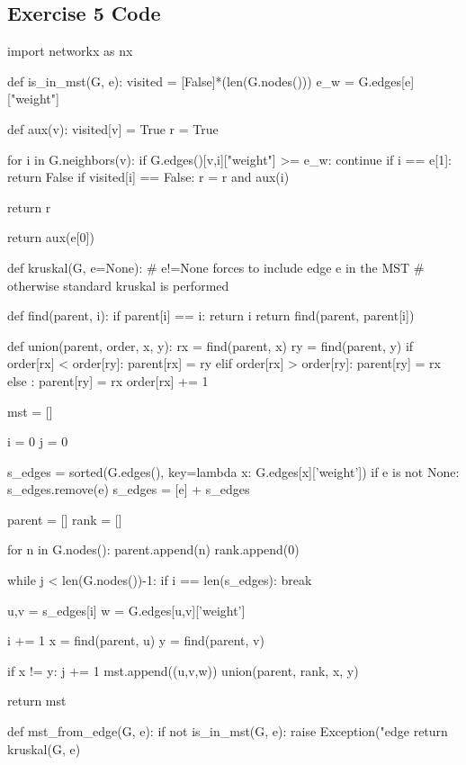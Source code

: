 \documentclass[paper=a4, fontsize=11pt]{scrartcl} %
\numberwithin{equation}{section} %
\numberwithin{figure}{section} %
\numberwithin{table}{section} %
\begin{document}
\newpage

\subsection*{Exercise 5 Code}

\begin{pycode}
import networkx as nx

def is_in_mst(G, e):
    visited = [False]*(len(G.nodes())) 
    e_w = G.edges[e]["weight"]
    
    def aux(v):
        visited[v] = True
        r = True
        
        for i in G.neighbors(v):
            if G.edges()[v,i]["weight"] >= e_w:
                continue
            if i == e[1]:
                return False
            if visited[i] == False: 
                r = r and aux(i)
        
        return r
    
    return aux(e[0])


def kruskal(G, e=None): 
    # e!=None forces to include edge e in the MST
    # otherwise standard kruskal is performed
    
    def find(parent, i):
        if parent[i] == i:
            return i
        return find(parent, parent[i])

    def union(parent, order, x, y):
        rx = find(parent, x)
        ry = find(parent, y)
        if order[rx] < order[ry]:
            parent[rx] = ry
        elif order[rx] > order[ry]:
            parent[ry] = rx
        else :
            parent[ry] = rx
            order[rx] += 1

    mst = []
    
    i = 0
    j = 0
    
    s_edges = sorted(G.edges(), key=lambda x: G.edges[x]['weight'])
    if e is not None:
        s_edges.remove(e)
        s_edges = [e] + s_edges
        
    parent = []
    rank = [] 

    for n in G.nodes(): 
        parent.append(n)
        rank.append(0)
  
    while j < len(G.nodes())-1: 
        if i == len(s_edges): break
        
        u,v = s_edges[i]
        w = G.edges[u,v]['weight']
        
        i += 1
        x = find(parent, u)
        y = find(parent, v)

        if x != y: 
            j += 1 
            mst.append((u,v,w))
            union(parent, rank, x, y)
    
    return mst
    
def mst_from_edge(G, e):
    if not is_in_mst(G, e):
        raise Exception("edge %
    return kruskal(G, e)
    
\end{pycode}


\newpage
 

\end{document}

